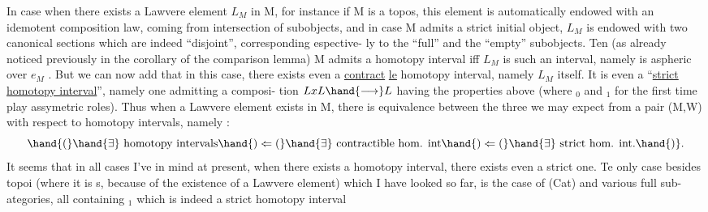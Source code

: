 
In case when there exists a Lawvere element  $L_M$ in M, 
for instance if M is a topos, this element is automatically endowed with
an idemotent composition law, coming from intersection of subobjects,
and in case M admits a strict initial object, $L_M$ is endowed with two
canonical sections which are indeed ``disjoint'', corresponding espective-%
ly to the ``full'' and the ``empty'' subobjects. Ten (as already noticed
previously in the corollary of  the comparison lemma) M admits a
homotopy interval iff $L_M$ is such an interval, namely is aspheric over
$e_M$ . But we can now add that in this case, there exists even a \uline{contract}%
\uline{le} homotopy interval, namely $L_M$ itself. 
 It is even a ``\uline{strict homotopy interval}'', namely one admitting a composi-%
tion $LxL \hand{\longrightarrow} L$ having the properties above (where \hand{\ensuremath{\delta}}$_0$ and \hand{\ensuremath{\delta}}$_1$\hand{,} for the first
time\hand{,} play assymetric roles\hand{!}). Thus when a Lawvere element exists in M,
there is equivalence between the three  we may expect from
a pair (M,W)\hand{,} with respect to homotopy intervals, namely :
\[ \hand{\ensuremath{(}}\hand{\ensuremath{\exists}}\text{ homotopy intervals}\hand{\ensuremath{)\Leftarrow(}}\hand{\ensuremath{\exists}}\text{ contractible hom. int}\hand{\ensuremath{)\Leftarrow(}}\hand{\ensuremath{\exists}}\text{ strict hom. int.}\hand{\ensuremath{)}} . \]
It seems that in all cases I've in mind at present, when there exists a
homotopy interval, there exists even a strict one. Te only case besides
topoi (where it is s, because of the existence of a Lawvere element)
which I have looked  so far, is the case of (Cat) and various full sub-%
ategories, all containing \hand{\ensuremath{\Delta}}$_1$ which is indeed a strict homotopy interval\hand{,}
